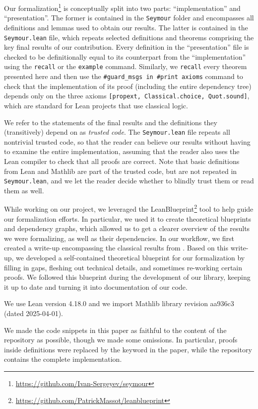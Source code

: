 Our formalization\footnote{\url{https://github.com/Ivan-Sergeyev/seymour}} is conceptually split into two parts: ``implementation'' and ``presentation''. The former is contained in the \texttt{Seymour} folder and encompasses all definitions and lemmas used to obtain our results. The latter is contained in the \texttt{Seymour.lean} file, which repeats selected definitions and theorems comprising the key final results of our contribution. Every definition in the ``presentation'' file is checked to be definitionally equal to its counterpart from the ``implementation'' using the \texttt{recall} or the \texttt{example} command. Similarly, we \texttt{recall} every theorem presented here and then use the \texttt{\#guard\_msgs in \#print axioms} command to check that the implementation of its proof (including the entire dependency tree) depends only on the three axioms \texttt{[propext, Classical.choice, Quot.sound]}, which are standard for Lean projects that use classical logic.

We refer to the statements of the final results and the definitions they (transitively) depend on as \emph{trusted code}. The \texttt{Seymour.lean} file repeats all nontrivial trusted code, so that the reader can believe our results \cite{Pollack1997} without having to examine the entire implementation, assuming that the reader also uses the Lean compiler to check that all proofs are correct. Note that basic definitions from Lean and Mathlib are part of the trusted code, but are not repeated in \texttt{Seymour.lean}, and we let the reader decide whether to blindly trust them or read them as well.

While working on our project, we leveraged the LeanBlueprint\footnote{\url{https://github.com/PatrickMassot/leanblueprint}} tool to help guide our formalization efforts. In particular, we used it to create theoretical blueprints and dependency graphs, which allowed us to get a clearer overview of the results we were formalizing, as well as their dependencies. In our workflow, we first created a write-up encompassing the classical results from \cite{Truemper2016}. Based on this write-up, we developed a self-contained theoretical blueprint for our formalization by filling in gaps, fleshing out technical details, and sometimes re-working certain proofs. We followed this blueprint during the development of our library, keeping it up to date and turning it into documentation of our code.

We use Lean version 4.18.0 and we import Mathlib library revision aa936c3 (dated 2025-04-01).

We made the code snippets in this paper as faithful to the content of the repository as possible, though we made some omissions. In particular, proofs inside definitions were replaced by the  keyword in the paper, while the repository contains the complete implementation.